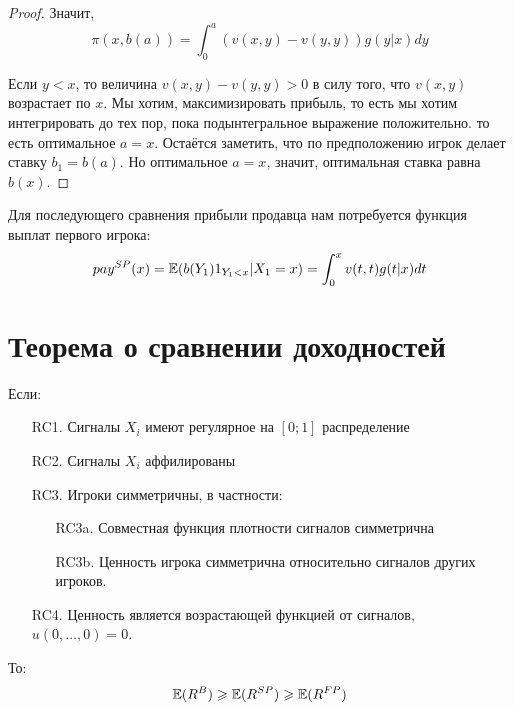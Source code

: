 \begin{itemize}
\begin{proof}
Значит,
\begin{equation}
\pi(x,b(a))=\int_{0}^{a}(v(x,y)-v(y,y)) g(y|x)dy
\end{equation}

Если $ y<x $, то величина $ v(x,y)-v(y,y)>0 $ в силу того, что $ v(x,y) $ возрастает по $ x $. Мы хотим, максимизировать прибыль, то есть мы хотим интегрировать до тех пор, пока подынтегральное выражение положительно. то есть оптимальное $ a=x $. Остаётся заметить, что по предположению игрок делает ставку $ b_{1}=b(a) $. Но оптимальное $ a=x $, значит, оптимальная ставка равна $ b(x) $.


\end{proof}


Для последующего сравнения прибыли продавца нам потребуется функция выплат первого игрока:
\begin{equation}
pay^{SP}(x)=\operatorname{\mathbb{E}}(b(Y_{1})1_{Y_{1}<x}|X_{1}=x)=\int_{0}^{x}v(t,t)g(t|x)dt
\end{equation}





\end{itemize}



\section{Теорема о сравнении доходностей}


\begin{myth}
Если:

\begin{enumerate}
\item[RC1.] Сигналы $ X_{i} $ имеют регулярное на $ [0;1] $ распределение
\item[RC2.] Сигналы $ X_{i} $ аффилированы
\item[RC3.] Игроки симметричны, в частности:
\begin{enumerate}
\item[RC3a.] Совместная функция плотности сигналов симметрична
\item[RC3b.] Ценность игрока симметрична относительно сигналов других игроков.
\end{enumerate}
\item[RC4.] Ценность является возрастающей функцией от сигналов, $ u(0,\ldots,0)=0 $.

\end{enumerate}

То:
\begin{equation}
\operatorname{\mathbb{E}}(R^{B})\geqslant \operatorname{\mathbb{E}}(R^{SP})\geqslant \operatorname{\mathbb{E}}(R^{FP})
\end{equation}

\end{myth}


